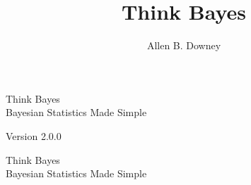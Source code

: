 \documentclass[12pt]{book}
\title{Think Bayes}
\author{Allen B. Downey}
\theoremstyle{exercise}
\newcommand{\thetitle}{Think Bayes}
\newcommand{\thesubtitle}{Bayesian Statistics Made Simple}
\newcommand{\theversion}{2.0.0}
\newif\ifplastex
\begin{document}
\frontmatter


\newcommand{\PMF}{\mathrm{PMF}}
\newcommand{\PDF}{\mathrm{PDF}}
\newcommand{\CDF}{\mathrm{CDF}}
\newcommand{\ICDF}{\mathrm{ICDF}}

\ifplastex
    \usepackage{localdef}
    \maketitle

\newcount\anchorcnt
\newcommand*{\Anchor}[1]{%
  \@bsphack%
    \Hy@GlobalStepCount\anchorcnt%
    \edef\@currentHref{anchor.\the\anchorcnt}%
    \Hy@raisedlink{\hyper@anchorstart{\@currentHref}\hyper@anchorend}%
    \M@gettitle{}\label{#1}%
    \@esphack%
}
\else



\begin{latexonly}

\renewcommand{\topfraction}{0.9}
\renewcommand{\blankpage}{\thispagestyle{empty} \quad \newpage}


\thispagestyle{empty}

\begin{flushright}
\vspace*{2.0in}

\begin{spacing}{3}
{\huge \thetitle}\\
{\Large \thesubtitle}
\end{spacing}

\vspace{0.25in}

Version \theversion

\vfill

\end{flushright}


\blankpage
\blankpage

\pagebreak
\thispagestyle{empty}

\begin{flushright}
\vspace*{2.0in}

\begin{spacing}{3}
{\huge \thetitle}\\
{\Large \thesubtitle}
\end{spacing}


\end{flushright}
\end{latexonly}
\end{document}
